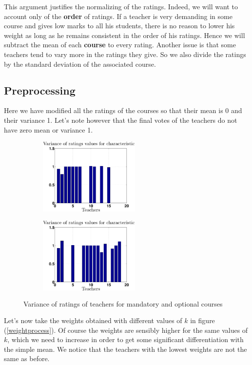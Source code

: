 \documentclass[12pt,a4paper]{article}
\begin{document}
This argument justifies the normalizing of the ratings. Indeed, we will want to account only of the \textbf{order} of ratings. If a teacher is very demanding in some course and gives low marks to all his students, there is no reason to lower his weight as long as he remains consistent in the order of his ratings. Hence we will subtract the mean of each \textbf{course} to every rating. Another issue is that some teachers tend to vary more in the ratings they give. So we also divide the ratings by the standard deviation of the associated course.
\FloatBarrier

\subsection*{Preprocessing}
Here we have modified all the ratings of the courses so that their mean is 0 and their variance 1. Let's note however that the final votes of the teachers do not have zero mean or variance 1.

\begin{figure}
\centering
\begin{subfigure}[b]{0.49\textwidth}
\includegraphics[width = 5cm]{preprocess/ppvarTeachersC1.eps}
\end{subfigure}
\begin{subfigure}[b]{0.49\textwidth}
\includegraphics[width = 5cm]{preprocess/ppvarTeachersC2.eps}
\end{subfigure}
\caption{Variance of ratings of teachers for mandatory and optional courses}
\end{figure}

Let's now take the weights obtained with different values of $k$ in figure (\ref{weightprocess}). Of course the weights are sensibly higher for the same values of $k$, which we need to increase in order to get some significant differentiation with the simple mean. We notice that the teachers with the lowest weights are not the same as before.
\end{document}
